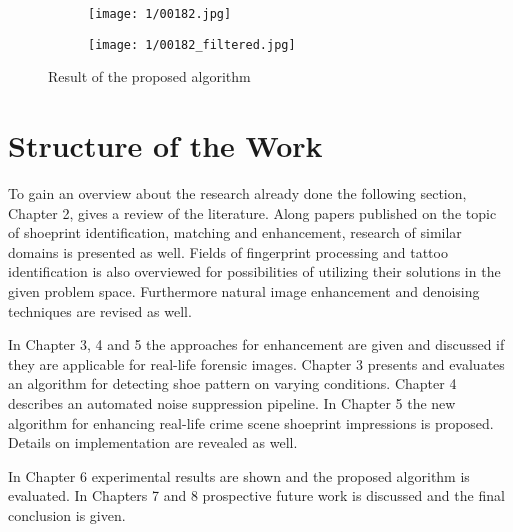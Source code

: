 \documentclass[draft,final]{vutinfth} %
\begin{document}
\begin{figure}[h]
  \centering
  \begin{subfigure}[b]{0.45\columnwidth}
    \centering
    \texttt{[image: 1/00182.jpg]}
    \label{fig:intro:orig}
  \end{subfigure}
  \begin{subfigure}[b]{0.45\columnwidth}
    \centering
    \texttt{[image: 1/00182\_filtered.jpg]}
    \label{fig:intro:enhanced}
  \end{subfigure}
  \caption{Result of the proposed algorithm}
  \label{fig:example}
\end{figure}

\section{Structure of the Work}
\par
To gain an overview about the research already done the following section, Chapter 2, gives a review of the literature. 
Along papers published on the topic of shoeprint identification, matching and enhancement, research of similar domains is presented as well.
Fields of fingerprint processing and tattoo identification is also overviewed for possibilities of utilizing their solutions in the given problem space.
Furthermore natural image enhancement and denoising techniques are revised as well.
\par
In Chapter 3, 4 and 5 the approaches for enhancement are given and discussed if they are applicable for real-life forensic images.
Chapter 3 presents and evaluates an algorithm for detecting shoe pattern on varying conditions.
Chapter 4 describes an automated noise suppression pipeline.
In Chapter 5 the new algorithm for enhancing real-life crime scene shoeprint impressions is proposed.
Details on implementation are revealed as well.
\par
In Chapter 6 experimental results are shown and the proposed algorithm is evaluated.
In Chapters 7 and 8 prospective future work is discussed and the final conclusion is given. 
\end{document}
